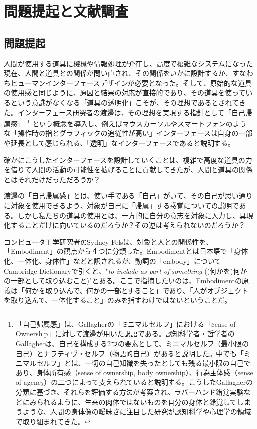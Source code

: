 \chapter{問題提起と文献調査}
\label{related_works}

\section{問題提起}
人間が使用する道具に機械や情報処理が介在し、高度で複雑なシステムになった現在、人間と道具との関係が問い直され、その関係をいかに設計するか、すなわちヒューマンインターフェースデザインが必要となった。そして、原始的な道具の使用感と同じように、原因と結果の対応が直接的であり、その道具を使っているという意識がなくなる「道具の透明化」こそが、その理想であるとされてきた\cite{Watanabe2017}。インターフェース研究者の渡邊は、その理想を実現する指針として「自己帰属感」
\footnote{「自己帰属感」は、Gallagherの「ミニマルセルフ」における「Sense of Ownership」に対して渡邊が用いた訳語である\cite{Watanabe2017}。認知科学者・哲学者のGallagherは、自己を構成する2つの要素として、ミニマルセルフ（最小限の自己）とナラティヴ・セルフ（物語的自己）があると説明した\cite{Gallagher2000}。中でも「ミニマルセルフ」とは、一切の自己知識を失ったとしても残る最小限の自己であり、身体所有感（sense of ownership, body ownership）、行為主体感（sense of agency）の二つによって支えられていると説明する。こうしたGallagherの分類に基づき、それらを評価する方法が考案され、ラバーハンド錯覚実験などにみられるように、生来の肉体ではないものを自分の身体と錯覚してしまうような、人間の身体像の曖昧さに注目した研究が認知科学や心理学の領域で取り組まれてきた。}
という概念を導入し、例えばマウスカーソルやスマートフォンのような「操作時の指とグラフィックの追従性が高い」インターフェースは自身の一部や延長として感じられる、「透明」なインターフェースであると説明する。

確かにこうしたインターフェースを設計していくことは、複雑で高度な道具の力を借りて人間の活動の可能性を拡げることに貢献してきたが、人間と道具の関係とはそれだけだっただろうか？

渡邊の「自己帰属感」とは、使い手である「自己」がいて、その自己が思い通りに対象を使用できるよう、対象が自己に「帰属」する感覚についての説明である。しかし私たちの道具の使用とは、一方的に自分の意志を対象に入力し、具現化することだけに向いているのだろうか？その逆は考えられないのだろうか？

コンピュータ工学研究者のSydney Felsは、対象と人との関係性を、「Embodiment」の観点から４つに分類した\cite{Fels}。Embodimentとは日本語で「身体化、一体化、身体性」などと訳されるが、動詞の「embody」についてCambridge Dictionaryで引くと、"\textit{to include as part of something} ((何かを)何かの一部として取り込むこと)"とある\cite{embody}。ここで指摘したいのは、Embodimentの原義は「何かを取り込んで、何かの一部とすること」であり、「人がオブジェクトを取り込んで、一体化すること」のみを指すわけではないということだ。

